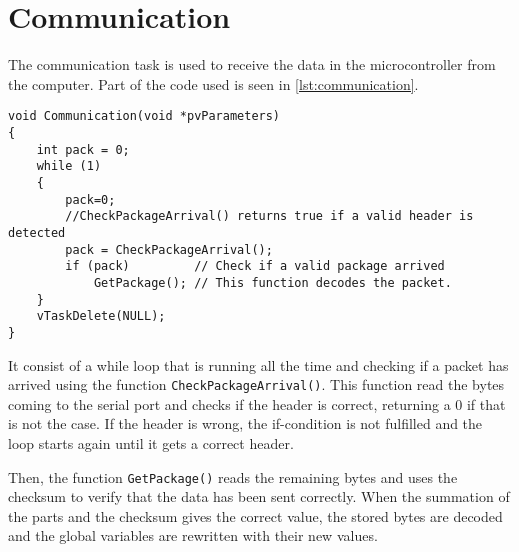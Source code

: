 \section{Communication}
The communication task is used to receive the data in the microcontroller from the computer. Part of the code used is seen in \autoref{lst:communication}.

\begin{lstlisting}[style=customcpp,
                caption={Code for the comunication task.}, 
                label=lst:communication]
void Communication(void *pvParameters)
{
	int pack = 0; 
    while (1)
    {
	    pack=0;
	    //CheckPackageArrival() returns true if a valid header is detected
        pack = CheckPackageArrival();
        if (pack)         // Check if a valid package arrived
            GetPackage(); // This function decodes the packet.
    }
    vTaskDelete(NULL);
}
\end{lstlisting}

It consist of a while loop that is running all the time and checking if a packet has arrived using the function \lstinline[style=customcppinline]{CheckPackageArrival()}. This function read the bytes coming to the serial port and checks if the header is correct, returning a 0 if that is not the case. If the header is wrong, the if-condition is not fulfilled and the loop starts again until it gets a correct header.

Then, the function \lstinline[style=customcppinline]{GetPackage()} reads the remaining bytes and uses the checksum to verify that the data has been sent correctly. When the summation of the parts and the checksum gives the correct value, the stored bytes are decoded and the global variables are rewritten with their new values.